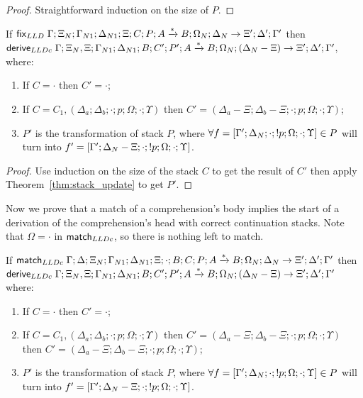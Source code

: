 \begin{proof}
Straightforward induction on the size of $P$.
\end{proof}

\begin{theorem}\label{thm:from_update_to_derivation}
   If $\mathsf{fix}_{LLD} \; \Gamma; \Xi_N; \Gamma_{N1}; \Delta_{N1}; \Xi; C; P; A \xrightarrow{*} B; \Omega_N; \Delta_N \rightarrow \Xi'; \Delta'; \Gamma'$ then
  $\mathsf{derive}_{LLDc} \; \Gamma; \Xi_N, \Xi; \Gamma_{N1}; \Delta_{N1}; B; C' ; P'; A \xrightarrow{*} B; \Omega_N; (\Delta_N - \Xi) \rightarrow \Xi'; \Delta'; \Gamma'$, where:

\begin{enumerate}
   \item If $C = \cdot$ then $C' = \cdot$;
   \item If $C = C_1, (\Delta_a; \Delta_b; \cdot; p; \Omega; \cdot; \Upsilon)$ then $C' = (\Delta_a - \Xi; \Delta_b - \Xi; \cdot; p; \Omega; \cdot; \Upsilon)$;
   \item $P'$ is the transformation of stack $P$, where $\forall f = [\Gamma'; \Delta_N; \cdot; {!} p; \Omega; \cdot; \Upsilon] \in P$ will turn into \linebreak $f'=[\Gamma';\Delta_N-\Xi;\cdot;{!} p;\Omega;\cdot;\Upsilon]$.
\end{enumerate}
\end{theorem}

\begin{proof}
Use induction on the size of the stack $C$ to get the result of $C'$ then apply Theorem~\ref{thm:stack_update} to get $P'$.
\end{proof}

Now we prove that a match of a comprehension's body implies the start of a derivation of the comprehension's head with correct continuation stacks. Note that $\Omega = \cdot$ in $\mathsf{match}_{LLDc}$, so there is nothing left to match.

\begin{lemma}\label{thm:match_to_derivation}
   If $\mathsf{match}_{LLDc} \; \Gamma; \Delta; \Xi_N; \Gamma_{N1}; \Delta_{N1}; \Xi; \cdot; B; C; P; A \xrightarrow{*} B;\Omega_N; \Delta_N \rightarrow \Xi'; \Delta'; \Gamma'$ then
      $\mathsf{derive}_{LLDc} \; \Gamma; \Xi_N, \Xi; \Gamma_{N1}; \Delta_{N1}; B; C'; P'; A \xrightarrow{*} B; \Omega_N; (\Delta_N - \Xi) \rightarrow \Xi'; \Delta'; \Gamma'$ where:
   
   \begin{enumerate}
      \item If $C = \cdot$ then $C' = \cdot$;
      \item If $C = C_1, (\Delta_a; \Delta_b; \cdot; p; \Omega; \cdot; \Upsilon)$ then $C' = (\Delta_a - \Xi; \Delta_b - \Xi; \cdot; p; \Omega; \cdot; \Upsilon)$ then \linebreak $C' = (\Delta_a - \Xi; \Delta_b - \Xi; \cdot; p; \Omega; \cdot; \Upsilon)$;
      \item $P'$ is the transformation of stack $P$, where $\forall f = [\Gamma'; \Delta_N; \cdot; {!} p; \Omega; \cdot; \Upsilon] \in P$ will turn into \linebreak $f' = [\Gamma'; \Delta_N - \Xi; \cdot; {!} p; \Omega; \cdot; \Upsilon]$.
   \end{enumerate}
\end{lemma}

